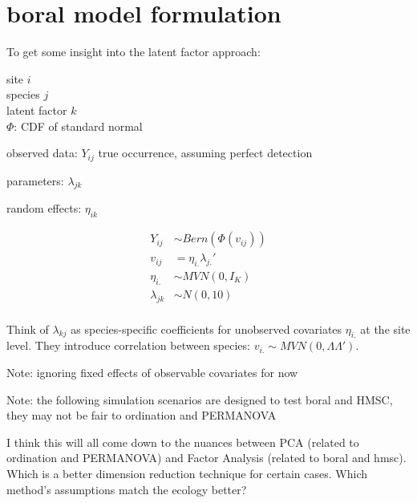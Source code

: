 \documentclass[12pt]{amsart}
\begin{document}
\section{boral model formulation}

\noindent To get some insight into the latent factor approach:

\noindent site $i$ \\
species $j$  \\ 
latent factor $k$ \\


\noindent $\Phi$: CDF of standard normal

\noindent observed data: $Y_{ij}$ true occurrence, assuming perfect detection 

\noindent parameters: $\lambda_{jk}$

\noindent random effects: $\eta_{ik}$

\begin{align*}
Y_{ij} &\sim Bern(\Phi(v_{ij})) \\
v_{ij} &= \eta_{i.} \lambda_{j.}' \\ 
\eta_{i.} &\sim MVN(0, I_K)\\
\lambda_{jk} &\sim N(0,10)\\
\end{align*}



\noindent Think of $\lambda_{kj}$ as species-specific coefficients for unobserved covariates $\eta_{i.}$ at the site level. They introduce correlation between species: $v_{i.} \sim MVN(0,  \Lambda \Lambda')$. 

Note: ignoring fixed effects of observable covariates for now


\vspace{.2in}

Note: the following simulation scenarios are designed to test boral and HMSC, they may not be fair to ordination and PERMANOVA

I think this will all come down to the nuances between PCA (related to ordination and PERMANOVA) and Factor Analysis (related to boral and hmsc). Which is a better dimension reduction technique for certain cases. Which method's assumptions match the ecology better?
\end{document}
